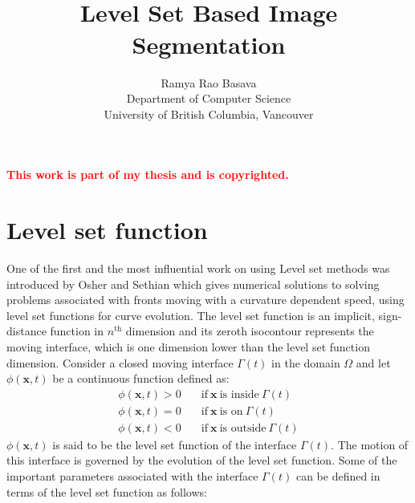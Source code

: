 \documentclass[10pt,letterpaper, onecolumn]{article}
\title{\vspace{-3cm}
\noindent\makebox[\linewidth]{\rule{0.8\textwidth}{2.0pt}} \\ 
\textbf{Level Set Based Image Segmentation} \\
\vspace{-0.30cm}
\noindent\makebox[\linewidth]{\rule{0.8\textwidth}{0.5pt}}}
\author{Ramya Rao Basava\\
Department of Computer Science\\
University of British Columbia, Vancouver}
\date{}
\begin{document}
\maketitle

\textcolor{red}{\textbf{This work is part of my thesis and is copyrighted.}}

\section{Level set function}
One of the first and the most influential work on using Level set methods was introduced by Osher and Sethian \cite{osher1988fronts} which gives numerical solutions to solving problems associated with fronts moving with a curvature dependent speed, using level set functions for curve evolution. The level set function is an implicit, sign-distance function in $n^{\text{th}}$ dimension and its zeroth isocontour represents the moving interface, which is one dimension lower than the level set function dimension. Consider a closed moving interface $\Gamma(t)$ in the domain $\Omega$ and let $\phi(\bm{x},t)$ be a continuous function defined as: 
%
\begin{subequations}
\begin{align}
\phi(\bm{x},t)>0 \quad & \text{if}\  \bm{x} \ \text{is inside} \ \Gamma(t) \\ 
\phi(\bm{x},t)=0 \quad & \text{if}\  \bm{x} \ \text{is on} \ \Gamma(t) \\
\phi(\bm{x},t)<0 \quad & \text{if}\  \bm{x} \ \text{is outside} \ \Gamma(t) 
\end{align}
\label{eqn3.1}
\end{subequations}
%
$\phi(\bm{x},t)$ is said to be the level set function of the interface $\Gamma(t)$. 
The motion of this interface is governed by the evolution of the level set function. Some of the important parameters associated with the interface $\Gamma(t)$ can be defined in terms of the level set function as follows:
\end{document}
